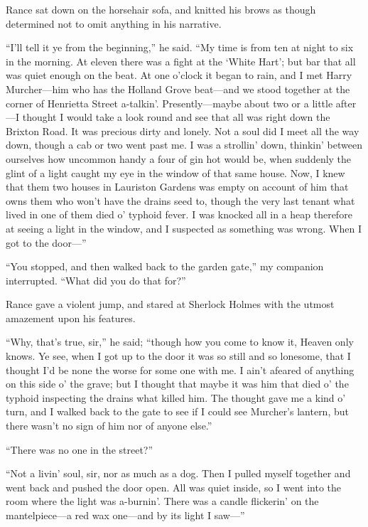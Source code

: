 \documentclass[12pt,english,oneside]{book}
\newcommand{\mdsh}[1]{\mbox{#1}\linebreak[1]}
\begin{document}
Rance sat down on the horsehair sofa, and knitted his brows as though
determined not to omit anything in his narrative.

{}``I'll tell it ye from the beginning,'' he said. {}``My time
is from ten at night to six in the morning. At eleven there was a
fight at the `White Hart'; but bar that all was quiet enough on the
beat. At one o'clock it began to rain, and I met Harry Murcher\mdsh{---}him
who has the Holland Grove beat\mdsh{---}and we stood together at
the corner of Henrietta Street a-talkin'. Presently\mdsh{---}maybe
about two or a little after\mdsh{---}I thought I would take a look
round and see that all was right down the Brixton Road. It was precious
dirty and lonely. Not a soul did I meet all the way down, though a
cab or two went past me. I was a strollin' down, thinkin' between
ourselves how uncommon handy a four of gin hot would be, when suddenly
the glint of a light caught my eye in the window of that same house.
Now, I knew that them two houses in Lauriston Gardens was empty on
account of him that owns them who won't have the drains seed to, though
the very last tenant what lived in one of them died o' typhoid fever.
I was knocked all in a heap therefore at seeing a light in the window,
and I suspected as something was wrong. When I got to the door\mdsh{---}''

{}``You stopped, and then walked back to the garden gate,'' my companion
interrupted. {}``What did you do that for?''

Rance gave a violent jump, and stared at Sherlock Holmes with the
utmost amazement upon his features.

{}``Why, that's true, sir,'' he said; {}``though how you come to
know it, Heaven only knows. Ye see, when I got up to the door it was
so still and so lonesome, that I thought I'd be none the worse for
some one with me. I ain't afeared of anything on this side o' the
grave; but I thought that maybe it was him that died o' the typhoid
inspecting the drains what killed him. The thought gave me a kind
o' turn, and I walked back to the gate to see if I could see Murcher's
lantern, but there wasn't no sign of him nor of anyone else.''

{}``There was no one in the street?''

{}``Not a livin' soul, sir, nor as much as a dog. Then I pulled myself
together and went back and pushed the door open. All was quiet inside,
so I went into the room where the light was a-burnin'. There was a
candle flickerin' on the mantelpiece\mdsh{---}a red wax one\mdsh{---}and
by its light I saw\mdsh{---}''
\end{document}

